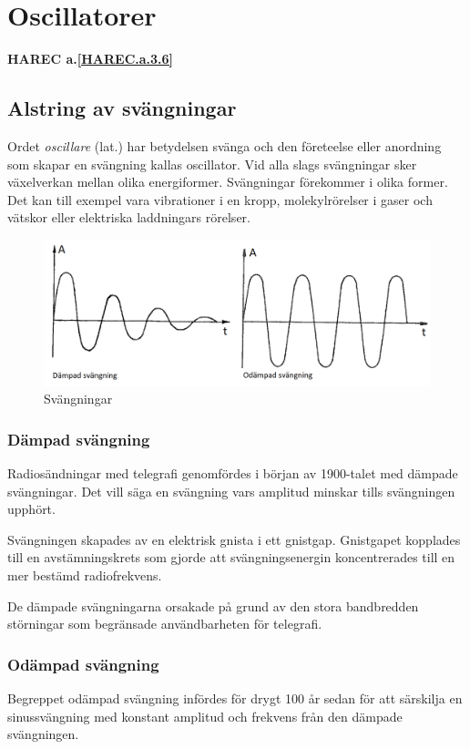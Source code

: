 \section{Oscillatorer}
\textbf{HAREC a.\ref{HAREC.a.3.6}\label{myHAREC.a.3.6}}
\label{oscillatorer}

\subsection{Alstring av svängningar}
Ordet \emph{oscillare} (lat.) har betydelsen svänga och den företeelse
eller anordning som skapar en svängning kallas oscillator.
Vid alla slags svängningar sker växelverkan mellan olika energiformer.
Svängningar förekommer i olika former.
Det kan till exempel vara vibrationer i en kropp, molekylrörelser i gaser och
vätskor eller elektriska laddningars rörelser.

\begin{figure}
\includegraphics[width=\textwidth]{images/cropped_pdfs/bild_2_3-63.pdf}
\caption{Svängningar}
\label{fig:BildII3-63}
\end{figure}

\subsubsection{Dämpad svängning}
Radiosändningar med telegrafi genomfördes i början av 1900-talet med dämpade
svängningar.
Det vill säga en svängning vars amplitud minskar tills svängningen upphört.

Svängningen skapades av en elektrisk gnista i ett gnistgap.
Gnistgapet kopplades till en avstämningskrets som gjorde att svängningsenergin
koncentrerades till en mer bestämd radiofrekvens.

De dämpade svängningarna orsakade på grund av den stora bandbredden störningar
som begränsade användbarheten för telegrafi.

\subsubsection{Odämpad svängning}
Begreppet odämpad svängning infördes för drygt 100 år sedan för att särskilja
en sinussvängning med konstant amplitud och frekvens från den dämpade
svängningen.

